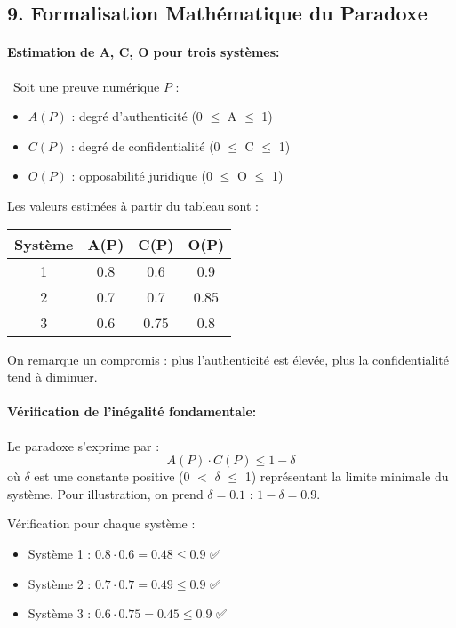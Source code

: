 \documentclass[12pt,a4paper]{report}
\begin{document}
{		\subsection*{9. Formalisation Mathématique du Paradoxe}
		
		\paragraph{ Estimation de A, C, O pour trois systèmes:}\
		Soit une preuve numérique $P$ :
		\begin{itemize}
			\item $A(P)$ : degré d'authenticité (0 $\le$ A $\le$ 1)
			\item $C(P)$ : degré de confidentialité (0 $\le$ C $\le$ 1)
			\item $O(P)$ : opposabilité juridique (0 $\le$ O $\le$ 1)
		\end{itemize}
		
		Les valeurs estimées à partir du tableau sont :
		
		\begin{center}
			\begin{tabular}{|c|c|c|c|}
				\hline
				Système & A(P) & C(P) & O(P) \\
				\hline
				1 & 0.8 & 0.6 & 0.9 \\
				2 & 0.7 & 0.7 & 0.85 \\
				3 & 0.6 & 0.75 & 0.8 \\
				\hline
			\end{tabular}
		\end{center}
		
		On remarque un compromis : plus l'authenticité est élevée, plus la confidentialité tend à diminuer.
		
		\paragraph{ Vérification de l'inégalité fondamentale:}
		Le paradoxe s'exprime par :
		\[
		A(P) \cdot C(P) \le 1 - \delta
		\]
		où $\delta$ est une constante positive (0 $<$ $\delta$ $\le$ 1) représentant la limite minimale du système.  
		Pour illustration, on prend $\delta = 0.1$ : $1 - \delta = 0.9$.
		
		Vérification pour chaque système :
		\begin{itemize}
			\item Système 1 : $0.8 \cdot 0.6 = 0.48 \le 0.9$ ✅
			\item Système 2 : $0.7 \cdot 0.7 = 0.49 \le 0.9$ ✅
			\item Système 3 : $0.6 \cdot 0.75 = 0.45 \le 0.9$ ✅
		\end{itemize}\
		
}
\end{document}
